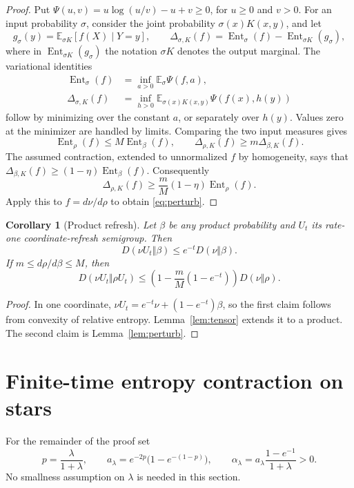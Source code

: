 \documentclass[11pt,reqno]{amsart}
\newtheorem{corollary}[theorem]{Corollary}
\theoremstyle{remark}
\newcommand{\E}{\mathbb E}
\DeclareMathOperator{\Ent}{Ent}
\numberwithin{equation}{section}
\begin{document}
\begin{proof}
Put $\Psi(u,v)=u\log(u/v)-u+v\ge0$, for $u\ge0$ and $v>0$. For an input probability $\sigma$, consider the joint probability $\sigma(x)K(x,y)$, and let
\[
 g_\sigma(y)=\E_{\sigma K}[f(X)\mid Y=y],\qquad
 \Delta_{\sigma,K}(f)=\Ent_\sigma(f)-\Ent_{\sigma K}(g_\sigma),
\]
where in $\Ent_{\sigma K}(g_\sigma)$ the notation $\sigma K$ denotes the output marginal. The variational identities
\begin{align*}
 \Ent_\sigma(f)&=\inf_{a>0}\E_\sigma\Psi(f,a),\\
 \Delta_{\sigma,K}(f)&=\inf_{h>0}\E_{\sigma(x)K(x,y)}\Psi(f(x),h(y))
\end{align*}
follow by minimizing over the constant $a$, or separately over $h(y)$. Values zero at the minimizer are handled by limits. Comparing the two input measures gives
\[
 \Ent_\rho(f)\le M\Ent_\beta(f),\qquad
 \Delta_{\rho,K}(f)\ge m\Delta_{\beta,K}(f).
\]
The assumed contraction, extended to unnormalized $f$ by homogeneity, says that $\Delta_{\beta,K}(f)\ge(1-\eta)\Ent_\beta(f)$. Consequently
\[
 \Delta_{\rho,K}(f)\ge\frac mM(1-\eta)\Ent_\rho(f).
\]
Apply this to $f=d\nu/d\rho$ to obtain \eqref{eq:perturb}.
\end{proof}

\begin{corollary}[Product refresh]\label{cor:noise}
Let $\beta$ be any product probability and $U_t$ its rate-one coordinate-refresh semigroup. Then
\[
 D(\nu U_t\Vert\beta)\le e^{-t}D(\nu\Vert\beta).
\]
If $m\le d\rho/d\beta\le M$, then
\[
 D(\nu U_t\Vert\rho U_t)
 \le\left(1-\frac mM(1-e^{-t})\right)D(\nu\Vert\rho).
\]
\end{corollary}

\begin{proof}
In one coordinate, $\nu U_t=e^{-t}\nu+(1-e^{-t})\beta$, so the first claim follows from convexity of relative entropy. Lemma~\ref{lem:tensor} extends it to a product. The second claim is Lemma~\ref{lem:perturb}.
\end{proof}

\section{Finite-time entropy contraction on stars}

For the remainder of the proof set
\begin{equation}\label{eq:alpha}
 p=\frac\lambda{1+\lambda},\qquad
 a_\lambda=e^{-2p}\bigl(1-e^{-(1-p)}\bigr),\qquad
 \alpha_\lambda=a_\lambda\frac{1-e^{-1}}{1+\lambda}>0.
\end{equation}
No smallness assumption on $\lambda$ is needed in this section.
\end{document}
